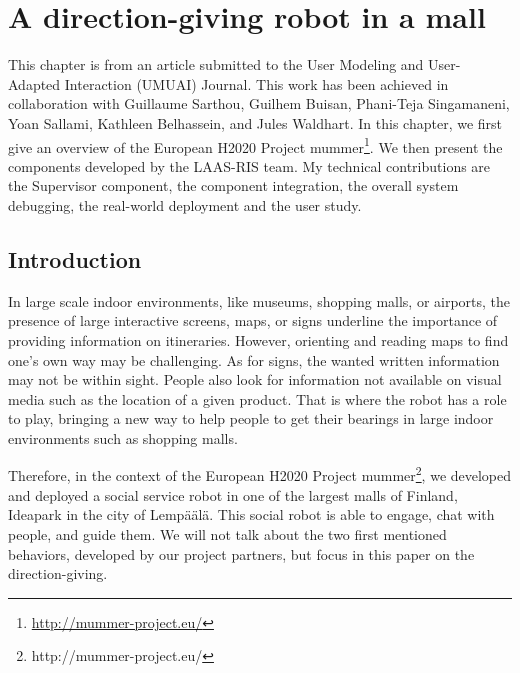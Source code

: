 \documentclass[a4paper,11pt,twoside]{StyleThese}
\begin{document}
\setcounter{chapter}{2} %
\dominitoc
\faketableofcontents
\fi

\chapter{A direction-giving robot in a mall}
\label{chapter:chap3}
\minitoc

This chapter is from an article submitted to the  User Modeling and User-Adapted Interaction (UMUAI) Journal. This work has been achieved in collaboration with Guillaume Sarthou, Guilhem Buisan, Phani-Teja Singamaneni, Yoan Sallami, Kathleen Belhassein, and Jules Waldhart. In this chapter, we first give an overview of the European H2020 Project \acrfull{mummer}\footnote{\url{http://mummer-project.eu/}}. We then present the components developed by the LAAS-RIS team. My technical contributions are the Supervisor component, the component integration, the overall system debugging, the real-world deployment and the user study.

\section{Introduction}

In large scale indoor environments, like museums, shopping malls, or airports, the presence of large interactive screens, maps, or signs underline the importance of providing information on itineraries. However, orienting and reading maps to find one's own way may be challenging. As for signs, the wanted written information may not be within sight. People also look for information not available on visual media such as the location of a given product. That is where the robot has a role to play, bringing a new way to help people to get their bearings in large indoor environments such as shopping malls.

Therefore, in the context of the European H2020 Project \acrshort{mummer}\footnote{http://mummer-project.eu/}, we developed and deployed a social service robot in one of the largest malls of Finland, Ideapark in the city of Lemp\"a\"al\"a. This social robot is able to engage, chat with people, and guide them. We will not talk about the two first mentioned behaviors, developed by our project partners, but focus in this paper on the direction-giving.
\end{document}
